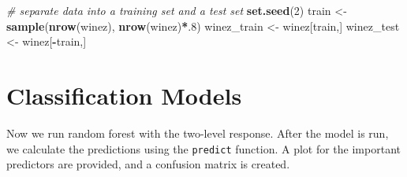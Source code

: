 \documentclass[
]{book}
\newenvironment{Shaded}{\begin{snugshade}}{\end{snugshade}}
\newcommand{\AttributeTok}[1]{\textcolor[rgb]{0.13,0.29,0.53}{#1}}
\newcommand{\CommentTok}[1]{\textcolor[rgb]{0.56,0.35,0.01}{\textit{#1}}}
\newcommand{\DecValTok}[1]{\textcolor[rgb]{0.00,0.00,0.81}{#1}}
\newcommand{\FunctionTok}[1]{\textcolor[rgb]{0.13,0.29,0.53}{\textbf{#1}}}
\newcommand{\NormalTok}[1]{#1}
\newcommand{\OtherTok}[1]{\textcolor[rgb]{0.56,0.35,0.01}{#1}}
\newcommand{\SpecialCharTok}[1]{\textcolor[rgb]{0.81,0.36,0.00}{\textbf{#1}}}
\newcommand{\StringTok}[1]{\textcolor[rgb]{0.31,0.60,0.02}{#1}}
\begin{document}
\begin{Shaded}
\begin{Highlighting}[]
\CommentTok{\# separate data into a training set and a test set }
\FunctionTok{set.seed}\NormalTok{(}\DecValTok{2}\NormalTok{)}
\NormalTok{train }\OtherTok{\textless{}{-}} \FunctionTok{sample}\NormalTok{(}\FunctionTok{nrow}\NormalTok{(winez), }\FunctionTok{nrow}\NormalTok{(winez)}\SpecialCharTok{*}\NormalTok{.}\DecValTok{8}\NormalTok{)}
\NormalTok{winez\_train }\OtherTok{\textless{}{-}}\NormalTok{ winez[train,]}
\NormalTok{winez\_test }\OtherTok{\textless{}{-}}\NormalTok{ winez[}\SpecialCharTok{{-}}\NormalTok{train,]}
\end{Highlighting}
\end{Shaded}

\hypertarget{classification-models}{%
\section{Classification Models}\label{classification-models}}

Now we run random forest with the two-level response. After the model is run, we calculate the predictions using the \texttt{predict} function. A plot for the important predictors are provided, and a confusion matrix is created.

\begin{Shaded}
\end{Shaded}
\end{document}

